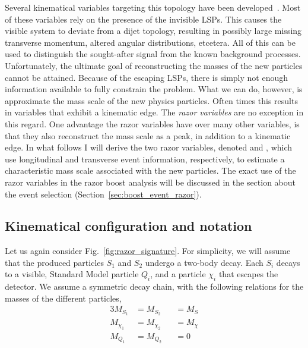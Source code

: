 Several kinematical variables targeting this topology have been
developed~\cite{Lester:1999tx,Barr:2003rg,Randall:2008rw,Polesello:2009rn,Bai:2012gs}.
Most of these variables rely on the presence of the invisible LSPs. This causes the visible system
to deviate from a dijet topology, resulting in possibly large missing transverse momentum, altered
angular distributions, etcetera. All of this can be used to distinguish the sought-after signal
from the known background processes. 
Unfortunately, the ultimate goal of reconstructing the masses of the new particles cannot be
attained. Because of the escaping LSPs, there is simply not enough information available to fully
constrain the problem. What we can do, however, is approximate the mass scale of the new physics
particles. Often times this results in variables that exhibit a kinematic edge. 
The \textit{razor variables} \cite{rogan,Rogan:1557072,Chatrchyan:2011ek,Chatrchyan:2014goa} are no
exception in this regard. One advantage the razor variables have over many other variables, is that
they also reconstruct the mass scale as a peak, in addition to a kinematic edge. 
In what follows I will derive the two razor variables, denoted \mr and \rsq, which use longitudinal
and transverse event information, respectively, to estimate a characteristic mass scale associated
with the new particles. 
The exact use of the razor variables in the razor boost analysis will be discussed in
the section about the event selection (Section~\ref{sec:boost_event_razor}). 


\subsection{Kinematical configuration and notation \label{sec:razor_notation}}

Let us again consider Fig.~\ref{fig:razor_signature}. For simplicity, we will assume that the
produced particles $S_1$ and $S_2$ undergo a two-body decay. Each $S_i$ decays to a visible,
Standard Model particle $Q_i$, and a particle $\chi_i$ that escapes the detector. 
We assume a symmetric decay chain, with the following relations for the masses of the different
particles,
\begin{alignat}{3}
  M_{S_1} &= M_{S_2} &&= M_S \label{eq:equal_S_masses}\\
  M_{\chi_1} &= M_{\chi_2} &&= M_{\chi} \label{eq:equal_chi_masses}\\
  M_{Q_1} &= M_{Q_2} &&= 0 \label{eq:no_Q_masses}
\end{alignat}


